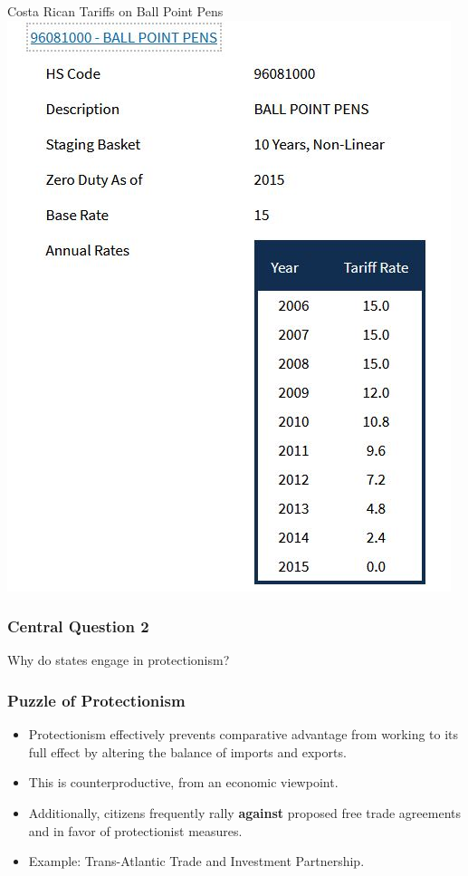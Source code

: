 \documentclass[handout]{beamer}
\begin{document}
\begin{frame}{\LARGE Costa Rican Tariffs on Ball Point Pens}
	\centering
	\includegraphics[width=\textwidth,height=0.8\textheight,keepaspectratio]{ball point pens.JPG}
\end{frame}


\begin{frame} 
	\frametitle{\LARGE{Central Question 2}}
	\centering
	\Large{Why do states engage in protectionism?}
\end{frame}


\begin{frame} 
	\frametitle{\LARGE{Puzzle of Protectionism}}
	\begin{itemize}
			\item Protectionism effectively prevents comparative advantage from working to its full effect by altering the balance of imports and exports. \pause
			\item This is counterproductive, from an economic viewpoint. \pause
			\item Additionally, citizens frequently rally \textbf{against} proposed free trade agreements and in favor of protectionist measures.
			\item Example: Trans-Atlantic Trade and Investment Partnership.
	\end{itemize}
\end{frame}
\end{document}
